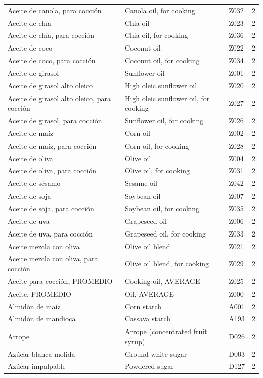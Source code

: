 {\begin{longtable}{p{4.3cm}p{5.5cm}p{1.5cm}p{0.7cm}}
Aceite de canola, para cocción & Canola oil, for cooking & Z032 & 2\\
Aceite de chía & Chia oil & Z023 & 2\\
Aceite de chía, para cocción & Chia oil, for cooking & Z036 & 2\\
Aceite de coco & Coconut oil & Z022 & 2\\
Aceite de coco, para cocción & Coconut oil, for cooking & Z034 & 2\\
Aceite de girasol & Sunflower oil & Z001 & 2\\
Aceite de girasol alto oleico & High oleic sunflower oil & Z020 & 2\\
Aceite de girasol alto oleico, para cocción & High oleic sunflower oil, for cooking & Z027 & 2\\
Aceite de girasol, para cocción & Sunflower oil, for cooking & Z026 & 2\\
Aceite de maíz & Corn oil & Z002 & 2\\
Aceite de maíz, para cocción & Corn oil, for cooking & Z028 & 2\\
Aceite de oliva & Olive oil & Z004 & 2\\
Aceite de oliva, para cocción & Olive oil, for cooking & Z031 & 2\\
Aceite de sésamo & Sesame oil & Z042 & 2\\
Aceite de soja & Soybean oil & Z007 & 2\\
Aceite de soja, para cocción & Soybean oil, for cooking & Z035 & 2\\
Aceite de uva & Grapeseed oil & Z006 & 2\\
Aceite de uva, para cocción & Grapeseed oil, for cooking & Z033 & 2\\
Aceite mezcla con oliva & Olive oil blend & Z021 & 2\\
Aceite mezcla con oliva, para cocción & Olive oil blend, for cooking & Z029 & 2\\
Aceite para cocción, PROMEDIO & Cooking oil, AVERAGE & Z025 & 2\\
Aceite, PROMEDIO & Oil, AVERAGE & Z000 & 2\\
Almidón de maíz & Corn starch & A001 & 2\\
Almidón de mandioca & Cassava starch & A193 & 2\\
Arrope & Arrope (concentrated fruit syrup) & D026 & 2\\
Azúcar blanca molida & Ground white sugar & D003 & 2\\
Azúcar impalpable & Powdered sugar & D127 & 2\\

\end{longtable}}

